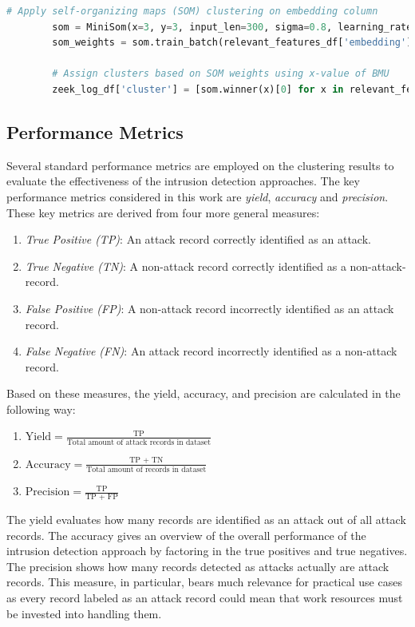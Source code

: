 \begin{minipage}\linewidth
	\begin{lstlisting}[language={python}, caption={Application of the SOM clustering approach on the previously calculated embeddings}, label={lst:som}] 
        # Apply self-organizing maps (SOM) clustering on embedding column
        som = MiniSom(x=3, y=3, input_len=300, sigma=0.8, learning_rate=0.2, random_seed=10)
        som_weights = som.train_batch(relevant_features_df['embedding'].tolist(), num_iteration=300)
        
        # Assign clusters based on SOM weights using x-value of BMU
        zeek_log_df['cluster'] = [som.winner(x)[0] for x in relevant_features_df['embedding'].tolist()]
	\end{lstlisting}
\end{minipage}

\subsection{Performance Metrics}
\label{subsec:performance_metrics}

Several standard performance metrics are employed on the clustering results to evaluate the effectiveness of the intrusion detection approaches. The key performance metrics considered in this work are \emph{yield}, \emph{accuracy} and \emph{precision}. These key metrics are derived from four more general measures:
\begin{enumerate}
	\item \emph{True Positive (TP)}: An attack record correctly identified as an attack.
	\item \emph{True Negative (TN)}: A non-attack record correctly identified as a non-attack-record.
	\item \emph{False Positive (FP)}: A non-attack record incorrectly identified as an attack record.
	\item \emph{False Negative (FN)}: An attack record incorrectly identified as a non-attack record.
\end{enumerate}

Based on these measures, the yield, accuracy, and precision are calculated in the following way:
\begin{enumerate}
    \item $\text{Yield} = \frac{\text{TP}}{\text{Total amount of attack records in dataset}}$
    \item $\text{Accuracy} = \frac{\text{TP + TN}}{\text{Total amount of records in dataset}}$
    \item $\text{Precision} = \frac{\text{TP}}{\text{TP + FP}}$
\end{enumerate}
The yield evaluates how many records are identified as an attack out of all attack records. The accuracy gives an overview of the overall performance of the intrusion detection approach by factoring in the true positives and true negatives. The precision shows how many records detected as attacks actually are attack records. This measure, in particular, bears much relevance for practical use cases as every record labeled as an attack record could mean that work resources must be invested into handling them.




